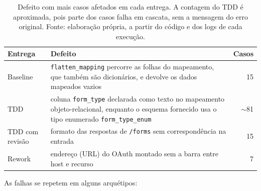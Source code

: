 \documentclass[a4paper,12pt,twoside,english,brazilian]{book}
\begin{document}
\begin{table}[htp]
  \centering
  \caption{Defeito com mais casos afetados em cada entrega. A contagem do TDD
    é aproximada, pois parte dos casos falha em cascata, sem a mensagem do
    erro original. Fonte: elaboração própria, a partir do código e dos logs
    de cada execução.}
  \label{tab:prejanus-defeitos}
  \begin{tabular}{lp{7.5cm}r}
    \hline
    Entrega & Defeito & Casos \\
    \hline
    Baseline & \texttt{flatten\_mapping} percorre as folhas do mapeamento,
      que também são dicionários, e devolve os dados mapeados vazios & 15 \\
    TDD & coluna \texttt{form\_type} declarada como texto no mapeamento objeto-relacional, enquanto o
      esquema fornecido usa o tipo enumerado \texttt{form\_type\_enum} & $\sim$81 \\
    TDD com revisão & formato das respostas de \texttt{/forms} sem
      correspondência na entrada & 15 \\
    Rework & endereço (URL) do OAuth montado sem a barra entre host e recurso & 7 \\
    \hline
  \end{tabular}
\end{table}

As falhas se repetem em alguns arquétipos:
\end{document}
